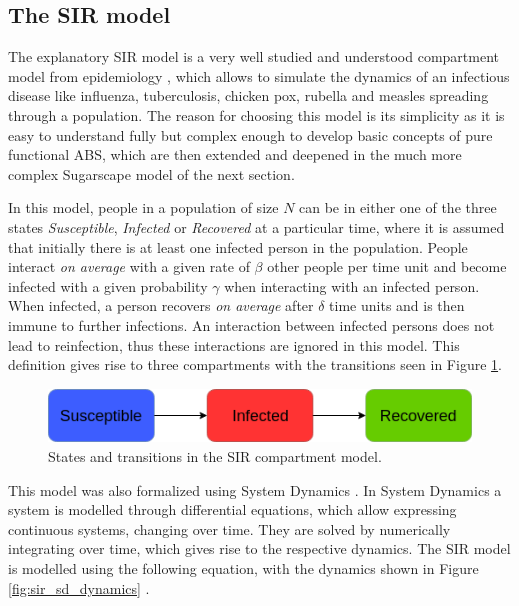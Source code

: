 \subsection{The SIR model}
\label{sec:sir_model}

The explanatory SIR model is a very well studied and understood compartment model from epidemiology \cite{kermack_contribution_1927}, which allows to simulate the dynamics of an infectious disease like influenza, tuberculosis, chicken pox, rubella and measles spreading through a population. The reason for choosing this model is its simplicity as it is easy to understand fully but complex enough to develop basic concepts of pure functional ABS, which are then extended and deepened in the much more complex Sugarscape model of the next section.

In this model, people in a population of size $N$ can be in either one of the three states \textit{Susceptible}, \textit{Infected} or \textit{Recovered} at a particular time, where it is assumed that initially there is at least one infected person in the population. People interact \textit{on average} with a given rate of $\beta$ other people per time unit and become infected with a given probability $\gamma$ when interacting with an infected person. When infected, a person recovers \textit{on average} after $\delta$ time units and is then immune to further infections. An interaction between infected persons does not lead to reinfection, thus these interactions are ignored in this model. This definition gives rise to three compartments with the transitions seen in Figure \ref{fig:sir_transitions}.

\begin{figure}
	\centering
	\includegraphics[width=.7\textwidth, angle=0]{./fig/timedriven/SIR_transitions.png}
	\caption[States and transitions in the SIR compartment model]{States and transitions in the SIR compartment model.}
	\label{fig:sir_transitions}
\end{figure}

This model was also formalized using System Dynamics \cite{porter_industrial_1962}. In System Dynamics a system is modelled through differential equations, which allow expressing continuous systems, changing over time. They are solved by numerically integrating over time, which gives rise to the respective dynamics. The SIR model is modelled using the following equation, with the dynamics shown in Figure \ref{fig:sir_sd_dynamics} .

